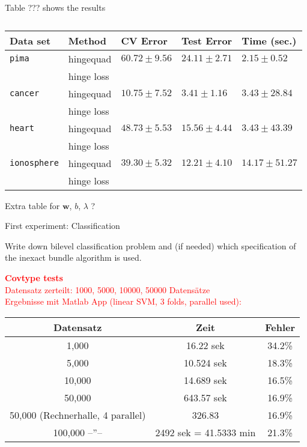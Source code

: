 Table ??? shows the results 

\begin{center}
\begin{table}[H]%
	\begin{tabular}{lllll}
		\hline
		Data set & Method & CV Error & Test Error & Time (sec.) \\
		\hline
		\texttt{pima} & hingequad & \(60.72 \pm 9.56\) & \(24.11\pm 2.71\) & \(2.15 \pm 0.52\)\\
		 &              hinge loss & & & \\
		\texttt{cancer} &  hingequad & \(10.75\pm 7.52\) & \(3.41 \pm 1.16\) & \(3.43 \pm 28.84\) \\
		 &              hinge loss & & & \\
		\texttt{heart} &  hingequad & \(48.73 \pm 5.53\) & \(15.56 \pm 4.44\) & \(3.43 \pm 43.39\)\\
		 &              hinge loss & & & \\
		\texttt{ionosphere} &  hingequad & \(39.30 \pm 5.32\) & \(12.21 \pm 4.10\) & \(14.17 \pm 51.27\)\\
		 &              hinge loss & & & \\
	\end{tabular}
	\caption{}
	\label{res_table}
\end{table}
\end{center}


Extra table for \(\bm{w}\), \(b\), \(\lambda\) ?

First experiment: Classification

Write down bilevel classification problem and (if needed) which specification of the inexact bundle algorithm is used.















\textcolor{red}{\textbf{Covtype tests}\\
Datensatz zerteilt: 1000, 5000, 10000, 50000 Datens\"atze\\
Ergebnisse mit Matlab App (linear SVM, 3 folds, parallel used):\\
\begin{tabular}{c|c|c}
Datensatz & Zeit & Fehler \\
\hline
1,000 & 16.22 sek & 34.2\% \\
5,000 & 10.524 sek & 18.3\% \\
10,000 & 14.689 sek & 16.5\% \\
50,000 &  643.57 sek & 16.9\% \\
50,000 (Rechnerhalle, 4 parallel) & 326.83 & 16.9\% \\
100,000 --''-- & 2492 sek = 41.5333 min & 21.3\%
\end{tabular}}

